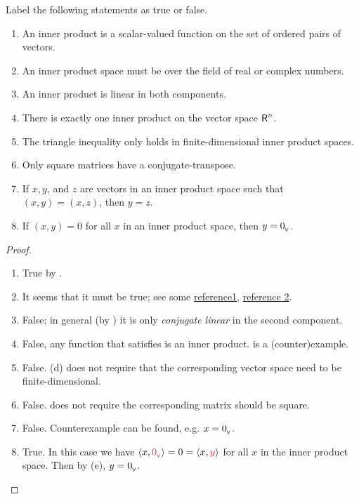 \exercisesection

\begin{exercise} \label{exercise 6.1.1}
Label the following statements as true or false.
\begin{enumerate}
\item An inner product is a scalar-valued function on the set of ordered pairs of vectors.
\item An inner product space must be over the field of real or complex numbers.
\item An inner product is linear in both components.
\item There is exactly one inner product on the vector space \(\textsf{R}^n\).
\item The triangle inequality only holds in finite-dimensional inner product spaces.
\item Only square matrices have a conjugate-transpose.
\item If \(x, y\), and \(z\) are vectors in an inner product space such that \((x, y) = (x, z)\), then \(y = z\).
\item If \((x, y) = 0\) for all \(x\) in an inner product space, then \(y = 0_{_{\textsf{V}}}\).
\end{enumerate}
\end{exercise}

\begin{proof} \ 

\begin{enumerate}
\item True by .
\item It seems that it must be true; see some \href{https://math.stackexchange.com/questions/49348/inner-product-spaces-over-finite-fields}{reference1},
\href{https://mathoverflow.net/questions/129413/what-fields-can-be-used-for-an-inner-product-space}{reference 2}.

\item False; in general (by ) it is only \emph{conjugate linear} in the second component.
\item False, any function that satisfies  is an inner product.
 is a (counter)example.

\item False. (d) does not require that the corresponding vector space need to be finite-dimensional.

\item False.  does not require the corresponding matrix should be square.
\item False. Counterexample can be found, e.g. \(x = 0_{_{\textsf{V}}}\).
\item True. In this case we have \(\LG x, \RED{\OV} \RG = 0 = \LG x, \RED{y} \RG\) for all \(x\) in the inner product space.
Then by (e), \(y = 0_{_{\textsf{V}}}\).
\end{enumerate}
\end{proof}

